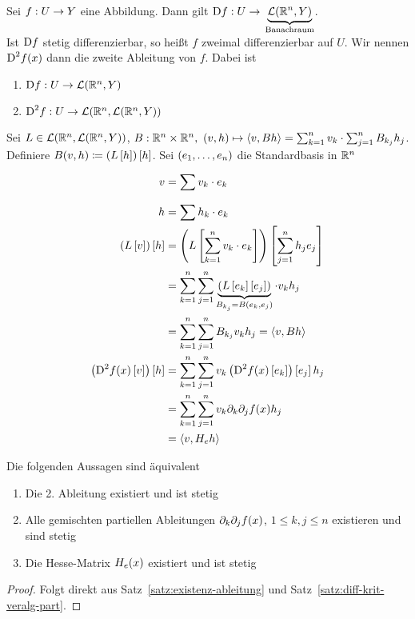 \begin{definition}
    Sei $f: U\rightarrow{} Y$ eine Abbildung. Dann gilt $\D f: U\fromto \underbrace{\mL\of{\R^n, Y}}_{\text{Banachraum}}$.\\
    Ist $\operatorname{D\!} f$ stetig differenzierbar, so heißt $f$ zweimal differenzierbar auf $U$. Wir nennen $\text{D}^2 f\of{x}$ dann die zweite Ableitung von $f$. Dabei ist
    \begin{enumerate}[label=(\roman*)]
        \item $\D f: U\fromto\mL\of{\R^n, Y}$
        \item $\text{D}^2 f: U\fromto \mL\of{\R^n, \mL\of{\R^n, Y}}$
    \end{enumerate}
    Sei $L\in\mL\of{\R^n, \mL\of{\R^n, Y}}$, $B: \mathbb{R}^n\times\mathbb{R}^n,~\left(v,h\right)\mapsto \left<v, Bh\right> = \sum_{k=1}^n v_k\cdot \sum_{j=1}^n B_{k_j} h_j$. Definiere $B\of{v,h} \coloneqq \pair{L\interv{h}}\interv{h}$. Sei $\left(e_1, \ldots, e_n\right)$ die Standardbasis in $\mathbb{R}^n$
    \begin{align*}
        v &= \sum_{}^{} v_k\cdot e_k\\
        h &= \sum h_k\cdot e_k\\
        \pair{L\interv{v}}\interv{h} &= \pair{L\interv{\sum_{k=1}^{n} v_k\cdot e_k}}\interv{\sum_{j=1}^{n} h_j e_j}\\
        &= \sum_{k=1}^{n} \sum_{j=1}^{n} \underbrace{\pair{L\interv{e_k}\interv{e_j}}}_{B_{k_j} = B\of{e_k, e_j}}\cdot v_k h_j\\
        &= \sum_{k=1}^{n} \sum_{j=1}^{n} B_{k_j} v_k h_j = \sprod{v, Bh}\\
        \pair{\text{D}^2 f\of{x}\interv{v}}\interv{h} &= \sum_{k=1}^{n} \sum_{j=1}^{n} v_k\pair{\text{D}^2 f\of{x}\interv{e_k}}\interv{e_j} h_j\\
        &= \sum_{k=1}^{n} \sum_{j=1}^{n} v_k \partial_k \partial_j f\of{x} h_j\\
        &= \sprod{v, H_e h}
    \end{align*}
\end{definition}

\begin{satz} %
    Die folgenden Aussagen sind äquivalent
    \begin{enumerate}[label=(\roman*)]
        \item Die 2. Ableitung existiert und ist stetig
        \item Alle gemischten partiellen Ableitungen $\partial_k\partial_j f\of{x}$, $1\leq k,j \leq n$ existieren und sind stetig
        \item Die Hesse-Matrix $H_e \of{x}$ existiert und ist stetig
    \end{enumerate}

    \begin{proof}
        Folgt direkt aus Satz~\ref{satz:existenz-ableitung} und Satz~\ref{satz:diff-krit-veralg-part}.
    \end{proof}
\end{satz}


